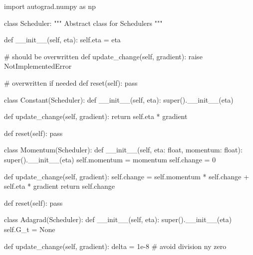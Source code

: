 \documentclass[%
oneside,                 %
final,                   %
10pt]{article}
\begin{document}
\bpycod
import autograd.numpy as np

class Scheduler:
    """
    Abstract class for Schedulers
    """

    def __init__(self, eta):
        self.eta = eta

    # should be overwritten
    def update_change(self, gradient):
        raise NotImplementedError

    # overwritten if needed
    def reset(self):
        pass


class Constant(Scheduler):
    def __init__(self, eta):
        super().__init__(eta)

    def update_change(self, gradient):
        return self.eta * gradient
    
    def reset(self):
        pass


class Momentum(Scheduler):
    def __init__(self, eta: float, momentum: float):
        super().__init__(eta)
        self.momentum = momentum
        self.change = 0

    def update_change(self, gradient):
        self.change = self.momentum * self.change + self.eta * gradient
        return self.change

    def reset(self):
        pass


class Adagrad(Scheduler):
    def __init__(self, eta):
        super().__init__(eta)
        self.G_t = None

    def update_change(self, gradient):
        delta = 1e-8  # avoid division ny zero
\end{document}
